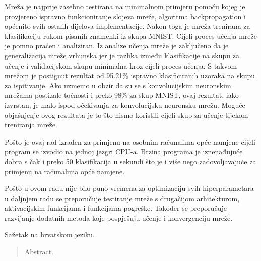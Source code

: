 \documentclass[times, utf8, zavrsni, numeric]{fer}
\begin{document}
Mreža je najprije zasebno testirana na minimalnom primjeru pomoću kojeg je provjereno ispravno funkcioniranje slojeva mreže, algoritma backpropagation i općenito svih ostalih dijelova implementacije. Nakon toga je mreža trenirana za klasifikaciju rukom pisanih znamenki iz skupa MNIST. Cijeli proces učenja mreže je pomno praćen i analiziran. Iz analize učenja mreže je zaključeno da je generalizacija mreže vrhunska jer je razlika između klasifikacije na skupu za učenje i validacijskom skupu minimalna kroz cijeli proces učenja. S takvom mrežom je postignut rezultat od 95.21\% ispravno klasificiranih uzoraka na skupu za ispitivanje. Ako uzmemo u obzir da su se s konvolucijskim neuronskim mrežama postizale točnosti i preko 98\% za skup MNIST, ovaj rezultat, iako izvrstan, je malo ispod očekivanja za konvolucijsku neuronsku mrežu. Moguće objašnjenje ovog rezultata je to što nismo koristili cijeli skup za učenje tijekom treniranja mreže.

Pošto je ovaj rad izrađen za primjenu na osobnim računalima opće namjene cijeli program se izvodio na jednoj jezgri CPU-a. Brzina programa je iznenađujuće dobra s čak i preko 50 klasifikacija u sekundi što je i više nego zadovoljavajuće za primjenu na računalima opće namjene.

Pošto u ovom radu nije bilo puno vremena za optimizaciju svih hiperparametara u daljnjem radu se preporučuje testiranje mreže s drugačijom arhitekturom, aktivacijskim funkcijama i funkcijama pogreške. Također se preporučuje razvijanje dodatnih metoda koje pospješuju učenje i konvergenciju mreže.




\begin{sazetak}
Sažetak na hrvatskom jeziku.

\end{sazetak}

\begin{abstract}
Abstract.

\end{abstract}
\end{document}
